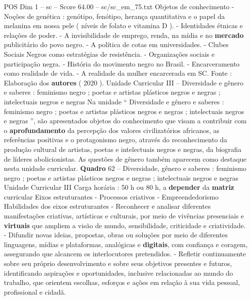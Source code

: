 \begin{textsample}{POS Dim 1 – sc – Score 64.00 – sc/sc\_em\_75.txt}
Objetos de conhecimento - Noções de genética : genótipo, fenótipo, herança quantitativa e o papel da melanina em nossa pele ( níveis de folato e vitamina D ). - Identidades étnicas e relações de poder. - A invisibilidade de emprego, renda, na mídia e no \textbf{mercado} publicitário do povo negro. - A política de cotas em universidades. - Clubes Sociais Negros como estratégias de resistência. - Organizações sociais e participação negra. - História do movimento negro no Brasil. - Encarceramento como realidade de vida. - A realidade da mulher encarcerada em SC.
Fonte : Elaboração dos \textbf{autores} ( 2020 ).
Unidade Curricular III – Diversidade e gênero e saberes : feminismo negro ; poetas e artistas plásticos negros e negras ; intelectuais negros e negras Na unidade “ Diversidade e gênero e saberes : feminismo negro ; poetas e artistas plásticos negros e negras ; intelectuais negros e negras ”, são apresentados objetos do conhecimento que visam a contribuir com o \textbf{aprofundamento} da percepção dos valores civilizatórios africanos, as referências positivas e o protagonismo negro, através do reconhecimento da produção cultural de artistas, poetas e intelectuais negros e negras, da biografia de líderes abolicionistas.
As questões de gênero também aparecem como destaque nesta unidade curricular. \textbf{Quadro} 62 – Diversidade, gênero e saberes : feminismo negro ; poetas e artistas plásticos negros e negras ; intelectuais negros e negras Unidade Curricular III Carga horária : 50 h ou 80 h, a \textbf{depender} da \textbf{matriz} curricular Eixos estruturantes - Processos criativos - Empreendedorismo Habilidades dos eixos estruturantes - Reconhecer e analisar diferentes manifestações criativas, artísticas e culturais, por meio de vivências presenciais e \textbf{virtuais} que ampliem a visão de mundo, sensibilidade, criticidade e criatividade. - Difundir novas ideias, propostas, obras ou soluções por meio de diferentes linguagens, mídias e plataformas, analógicas e \textbf{digitais}, com confiança e coragem, assegurando que alcancem os interlocutores pretendidos. - Refletir continuamente sobre seu próprio desenvolvimento e sobre seus objetivos presentes e futuros, identificando aspirações e oportunidades, inclusive relacionadas ao mundo do trabalho, que orientem escolhas, esforços e ações em relação à sua vida pessoal, profissional e cidadã.

\end{textsample}
